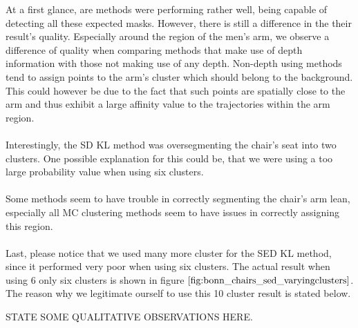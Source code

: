 At a first glance, are methods were performing rather well, being capable of detecting all these expected masks. However, there is still a difference in the their result's quality. Especially around the region of the men's arm, we observe a difference of quality when comparing methods that make use of depth information with those not making use of any depth. Non-depth using methods tend to assign points to the arm's cluster which should belong to the background. This could however be due to the fact that such points are spatially close to the arm and thus exhibit a large affinity value to the trajectories within the arm region. \\ \\
Interestingly, the SD KL method was oversegmenting the chair's seat into two clusters. One possible explanation for this could be, that we were using a too large probability value when using six clusters. \\ \\
Some methods seem to have trouble in correctly segmenting the chair's arm lean, especially all MC clustering methods seem to have issues in correctly assigning this region. \\ \\
Last, please notice that we used many more cluster for the SED KL method, since it performed very poor when using six clusters. The actual result when using 6 only six clusters is shown in figure $\ref{fig:bonn_chairs_sed_varyingclusters}$. The reason why we legitimate ourself to use this 10 cluster result is stated below.

STATE SOME QUALITATIVE OBSERVATIONS HERE. \\ \\

